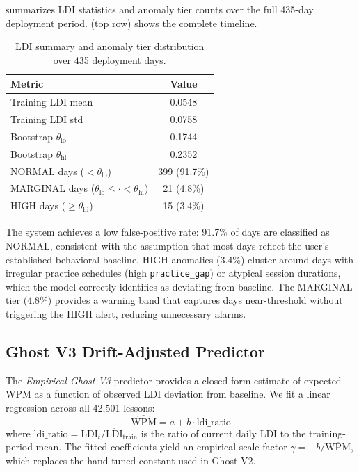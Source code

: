  summarizes LDI statistics and anomaly tier counts over the
full 435-day deployment period.
 (top row) shows the complete timeline.

\begin{table}[h]
  \centering
  \caption{LDI summary and anomaly tier distribution over 435 deployment days.}
  \label{tab:ldi}
  \begin{tabular}{lc}
    \toprule
    \textbf{Metric} & \textbf{Value} \\
    \midrule
    Training LDI mean              & 0.0548 \\
    Training LDI std               & 0.0758 \\
    Bootstrap $\theta_{\text{lo}}$ & 0.1744 \\
    Bootstrap $\theta_{\text{hi}}$ & 0.2352 \\
    \midrule
    NORMAL days  ($< \theta_{\text{lo}}$)                              & 399 (91.7\%) \\
    MARGINAL days ($\theta_{\text{lo}} \leq \cdot < \theta_{\text{hi}}$) & 21 (4.8\%) \\
    HIGH days ($\geq \theta_{\text{hi}}$)                              & 15 (3.4\%) \\
    \bottomrule
  \end{tabular}
\end{table}

The system achieves a low false-positive rate: 91.7\% of days are classified
as NORMAL, consistent with the assumption that most days reflect the
user's established behavioral baseline.
HIGH anomalies (3.4\%) cluster around days with irregular practice schedules
(high \texttt{practice\_gap}) or atypical session durations, which the model
correctly identifies as deviating from baseline.
The MARGINAL tier (4.8\%) provides a warning band that captures days
near-threshold without triggering the HIGH alert, reducing unnecessary alarms.

\subsection{Ghost V3 Drift-Adjusted Predictor}
\label{sec:ghost}

The \emph{Empirical Ghost V3} predictor provides a closed-form estimate of
expected WPM as a function of observed LDI deviation from baseline.
We fit a linear regression across all 42,501 lessons:
\[
  \widehat{\text{WPM}} = a + b \cdot \text{ldi\_ratio}
\]
where $\text{ldi\_ratio} = \text{LDI}_t / \overline{\text{LDI}}_{\text{train}}$
is the ratio of current daily LDI to the training-period mean.
The fitted coefficients yield an empirical scale factor
$\gamma = -b / \overline{\text{WPM}}$, which replaces the hand-tuned constant
used in Ghost V2.


